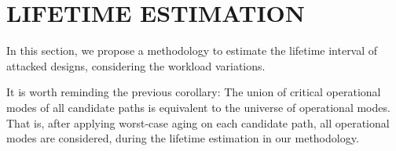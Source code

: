 
\section{LIFETIME ESTIMATION}
\label{sec:lt_estimation}
In this section, we propose a methodology to estimate the lifetime interval of attacked designs, considering the workload variations. 

It is worth reminding the previous corollary: The union of critical operational modes of all candidate paths is equivalent to the universe of operational modes. That is, after applying worst-case aging on each candidate path, all operational modes are considered, during the lifetime estimation in our methodology. 